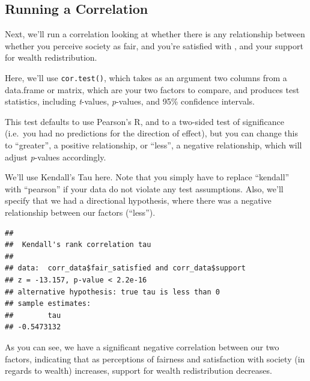 \documentclass[
]{book}
\newenvironment{Shaded}{\begin{snugshade}}{\end{snugshade}}
\newcommand{\AttributeTok}[1]{\textcolor[rgb]{0.77,0.63,0.00}{#1}}
\newcommand{\FunctionTok}[1]{\textcolor[rgb]{0.00,0.00,0.00}{#1}}
\newcommand{\NormalTok}[1]{#1}
\newcommand{\SpecialCharTok}[1]{\textcolor[rgb]{0.00,0.00,0.00}{#1}}
\newcommand{\StringTok}[1]{\textcolor[rgb]{0.31,0.60,0.02}{#1}}
\begin{document}
\hypertarget{running-a-correlation}{%
\subsection{Running a Correlation}\label{running-a-correlation}}

Next, we'll run a correlation looking at whether there is any relationship between whether you perceive society as fair, and you're satisfied with , and your support for wealth redistribution.

Here, we'll use \texttt{cor.test()}, which takes as an argument two columns from a data.frame or matrix, which are your two factors to compare, and produces test statistics, including \emph{t}-values, \emph{p}-values, and 95\% confidence intervals.

This test defaults to use Pearson's R, and to a two-sided test of significance (i.e.~you had no predictions for the direction of effect), but you can change this to ``greater'', a positive relationship, or ``less'', a negative relationship, which will adjust \emph{p}-values accordingly.

We'll use Kendall's Tau here. Note that you simply have to replace ``kendall'' with ``pearson'' if your data do not violate any test assumptions. Also, we'll specify that we had a directional hypothesis, where there was a negative relationship between our factors (``less'').

\begin{Shaded}
\end{Shaded}

\begin{verbatim}
## 
##  Kendall's rank correlation tau
## 
## data:  corr_data$fair_satisfied and corr_data$support
## z = -13.157, p-value < 2.2e-16
## alternative hypothesis: true tau is less than 0
## sample estimates:
##        tau 
## -0.5473132
\end{verbatim}

As you can see, we have a significant negative correlation between our two factors, indicating that as perceptions of fairness and satisfaction with society (in regards to wealth) increases, support for wealth redistribution decreases.
\end{document}
